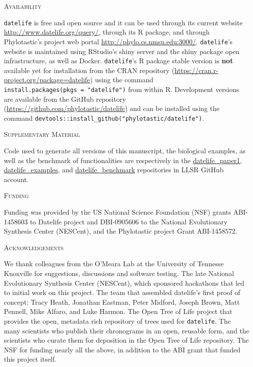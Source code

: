 \documentclass[11pt,]{article}
\begin{document}
\begin{center}
\textsc{Availability}
\end{center}

\texttt{datelife} is free and open source and it can be used through its
current website \url{http://www.datelife.org/query/}, through its R
package, and through Phylotastic's project web portal
\url{http://phylo.cs.nmsu.edu:3000/}. \texttt{datelife}'s website is
maintained using RStudio's shiny server and the shiny package open
infrastructure, as well as Docker. \texttt{datelife}'s R package stable
version is \textbf{not} available yet for installation from the CRAN
repository (\url{https://cran.r-project.org/package=datelife}) using the
command \texttt{install.packages(pkgs\ =\ "datelife")} from within R.
Development versions are available from the GitHub repository
(\url{https://github.com/phylotastic/datelife}) and can be installed
using the command
\texttt{devtools::install\_github("phylotastic/datelife")}.

\begin{center}
\textsc{Supplementary Material}
\end{center}

Code used to generate all versions of this manuscript, the biological
examples, as well as the benchmark of functionalities are respectively
in the
\href{https://github.com/LunaSare/datelife_paper1}{datelife\_paper1},
\href{https://github.com/LunaSare/datelife_examples}{datelife\_examples},
and
\href{https://github.com/LunaSare/datelife_benchmark}{datelife\_benchmark}
repositories in LLSR GitHub account.

\begin{center}
\textsc{Funding}
\end{center}

Funding was provided by the US National Science Foundation (NSF) grants
ABI-1458603 to Datelife project and DBI-0905606 to the National
Evolutionary Synthesis Center (NESCent), and the Phylotastic project
Grant ABI-1458572.

\begin{center}
\textsc{Acknowledgements}
\end{center}

We thank colleagues from the O'Meara Lab at the University of Tennesse
Knoxville for suggestions, discussions and software testing. The late
National Evolutionary Synthesis Center (NESCent), which sponsored
hackathons that led to initial work on this project. The team that
assembled datelife's first proof of concept: Tracy Heath, Jonathan
Eastman, Peter Midford, Joseph Brown, Matt Pennell, Mike Alfaro, and
Luke Harmon. The Open Tree of Life project that provides the open,
metadata rich repository of trees used for \texttt{datelife}. The many
scientists who publish their chronograms in an open, reusable form, and
the scientists who curate them for deposition in the Open Tree of Life
repository. The NSF for funding nearly all the above, in addition to the
ABI grant that funded this project itself.
\end{document}
